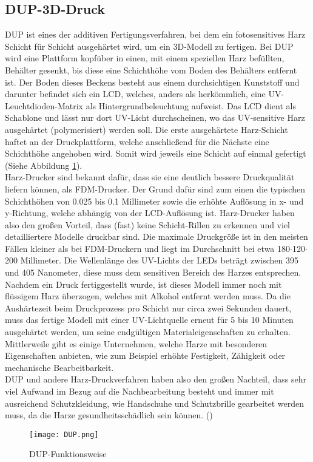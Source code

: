 \subsection{DUP-3D-Druck}
\label{subsec:tDUP}
\ac{DUP} ist eines der additiven Fertigungsverfahren, bei dem ein fotosensitives Harz Schicht für Schicht ausgehärtet wird, um ein \ac{3D}-Modell zu fertigen. Bei \ac{DUP} wird eine Plattform kopfüber in einen, mit einem speziellen Harz befüllten, Behälter gesenkt, bis diese eine Schichthöhe vom Boden des Behälters entfernt ist. Der Boden dieses Beckens besteht aus einem durchsichtigen Kunststoff und darunter befindet sich ein \ac{LCD}, welches, anders als herkömmlich, eine \ac{UV}-Leuchtdioden-Matrix als Hintergrundbeleuchtung aufweist. Das \ac{LCD} dient als Schablone und lässt nur dort \ac{UV}-Licht durchscheinen, wo das \ac{UV}-sensitive Harz ausgehärtet (polymerisiert) werden soll. Die erste ausgehärtete Harz-Schicht haftet an der Druckplattform, welche anschließend für die Nächste eine Schichthöhe angehoben wird. Somit wird jeweils eine Schicht auf einmal gefertigt (Siehe Abbildung \ref{fig:DUP}).\\ Harz-Drucker sind bekannt dafür, dass sie eine deutlich bessere Druckqualität liefern können, als \ac{FDM}-Drucker. Der Grund dafür sind zum einen die typischen Schichthöhen von 0.025 bis 0.1 Millimeter sowie die erhöhte Auflösung in x- und y-Richtung, welche abhängig von der \ac{LCD}-Auflösung ist.  Harz-Drucker haben also den großen Vorteil, dass (fast) keine Schicht-Rillen zu erkennen und viel detailliertere Modelle druckbar sind. Die maximale Druckgröße ist in den meisten Fällen kleiner als bei \ac{FDM}-Druckern und liegt im Durchschnitt bei etwa 180$\cdot$120$\cdot$200 Millimeter. Die Wellenlänge des \ac{UV}-Lichts der LEDs beträgt zwischen 395 und 405 Nanometer, diese muss dem sensitiven Bereich des Harzes entsprechen. Nachdem ein Druck fertiggestellt wurde, ist dieses Modell immer noch mit flüssigem Harz überzogen, welches mit Alkohol entfernt werden muss. Da die Aushärtezeit beim Druckprozess pro Schicht nur circa zwei Sekunden dauert, muss das fertige Modell mit einer \ac{UV}-Lichtquelle erneut für 5 bis 10 Minuten ausgehärtet werden, um seine endgültigen Materialeigenschaften zu erhalten. Mittlerweile gibt es einige Unternehmen, welche Harze mit besonderen Eigenschaften anbieten, wie zum Beispiel erhöhte Festigkeit, Zähigkeit oder mechanische Bearbeitbarkeit.\\
\ac{DUP} und andere Harz-Druckverfahren haben also den großen Nachteil, dass sehr viel Aufwand im Bezug auf die Nachbearbeitung besteht und immer mit ausreichend Schutzkleidung, wie Handschuhe und Schutzbrille gearbeitet werden muss, da die Harze gesundheitsschädlich sein können. (\cite{druckwegeDUP})
\begin{figure}[h]
\centering
\texttt{[image: DUP.png]}
\caption{DUP-Funktionsweise}
\label{fig:DUP}
\end{figure}

